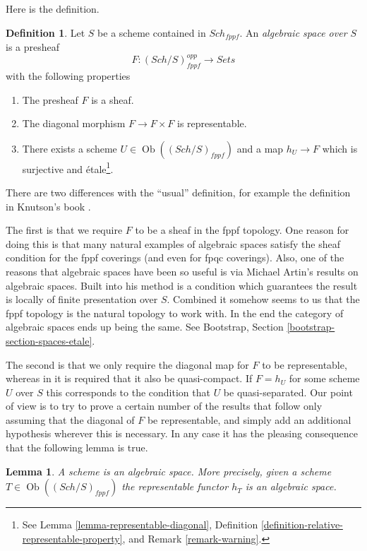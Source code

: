 \documentclass{stacks-project}
\theoremstyle{plain}
\newtheorem{lemma}[subsection]{Lemma}
\theoremstyle{definition}
\newtheorem{definition}[subsection]{Definition}
\theoremstyle{remark}
\numberwithin{equation}{subsection}
\def\Sch{\mathit{Sch}}
\def\Ob{\mathop{\mathrm{Ob}}\nolimits}
\begin{document}
\noindent
Here is the definition.

\begin{definition}
\label{definition-algebraic-space}
Let $S$ be a scheme contained in $\Sch_{fppf}$.
An {\it algebraic space over $S$} is a presheaf
$$
F : (\Sch/S)^{opp}_{fppf} \longrightarrow \textit{Sets}
$$
with the following properties
\begin{enumerate}
\item The presheaf $F$ is a sheaf.
\item The diagonal morphism $F  \to F \times F$ is representable.
\item There exists a scheme $U \in \Ob((\Sch/S)_{fppf})$
and a map $h_U \to F$ which is surjective and \'etale\footnote{See
Lemma \ref{lemma-representable-diagonal},
Definition \ref{definition-relative-representable-property}, and
Remark \ref{remark-warning}.}.
\end{enumerate}
\end{definition}

\noindent
There are two differences with the ``usual'' definition, for example the
definition in Knutson's book \cite{Kn}.

\medskip\noindent
The first is that we require $F$ to be a sheaf in the fppf topology.
One reason for doing this is that many natural examples
of algebraic spaces satisfy the sheaf condition for the fppf coverings
(and even for fpqc coverings). Also, one of the reasons that algebraic
spaces have been so useful is via Michael Artin's results on algebraic spaces.
Built into his method is a condition which guarantees the result is
locally of finite presentation over $S$.
Combined it somehow seems to us that the fppf topology
is the natural topology to work with. In the end the category
of algebraic spaces ends up being the same. See
Bootstrap, Section \ref{bootstrap-section-spaces-etale}.

\medskip\noindent
The second is that we only require the diagonal map for $F$ to be
representable, whereas in \cite{Kn} it is required that it also
be quasi-compact. If $F = h_U$ for some scheme $U$ over $S$
this corresponds to the condition that $U$ be quasi-separated.
Our point of view is to try to prove a certain
number of the results that follow only assuming that the diagonal
of $F$ be representable, and simply add an additional hypothesis wherever
this is necessary. In any case it has the pleasing consequence that
the following lemma is true.

\begin{lemma}
\label{lemma-scheme-is-space}
A scheme is an algebraic space. More precisely,
given a scheme $T \in \Ob((\Sch/S)_{fppf})$
the representable functor $h_T$ is an algebraic space.
\end{lemma}
\end{document}
